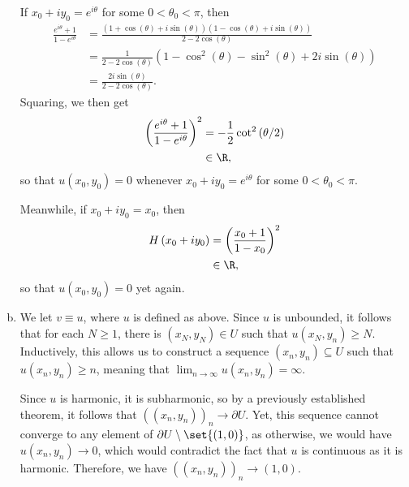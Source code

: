 \documentclass[10pt]{mypackage}
\begin{document}
\begin{solution}
\begin{enumerate}[(a)]
      If $x_0 + iy_0 = e^{i\theta}$ for some $0 < \theta_0 < \pi$, then
      \begin{align*}
        \frac{e^{i\theta} + 1}{1-e^{i\theta}} &= \frac{\left( 1 + \cos\left( \theta \right) + i\sin\left( \theta \right) \right)\left( 1 - \cos\left( \theta \right) + i\sin\left( \theta \right) \right)}{2-2\cos\left( \theta \right)}\\
                                              &= \frac{1}{2-2\cos\left( \theta \right)} \left( 1-\cos^2\left( \theta \right)-\sin^2\left( \theta \right) + 2i\sin\left( \theta \right) \right)\\
                                              &= \frac{2i\sin\left( \theta \right)}{2-2\cos\left( \theta \right)}.
      \end{align*}
      Squaring, we then get
      \begin{align*}
        \left( \frac{e^{i\theta} + 1}{1-e^{i\theta}} \right)^2 &= -\frac{1}{2}\cot^2\left( \theta/2 \right)\\
                                                               &\in \R,
      \end{align*}
      so that $u\left( x_0,y_0 \right) = 0$ whenever $x_0 + iy_0 = e^{i\theta}$ for some $0 < \theta_0 < \pi$.\newline

      Meanwhile, if $x_0 + iy_0 = x_0$, then
      \begin{align*}
        H\left( x_0 + iy_0 \right) &= \left( \frac{x_0 + 1}{1-x_0} \right)^2\\
                                   &\in \R,
      \end{align*}
      so that $u\left( x_0,y_0 \right) = 0$ yet again.
    \item We let $v \equiv u$, where $u$ is defined as above. Since $u$ is unbounded, it follows that for each $N\geq 1$, there is $\left( x_N,y_N \right)\in U$ such that $u\left( x_N,y_n \right) \geq N$. Inductively, this allows us to construct a sequence $\left( x_n,y_n \right)\subseteq U$ such that $u\left( x_n,y_n \right) \geq n$, meaning that $\lim_{n\rightarrow\infty}u\left( x_n,y_n \right) =\infty$.\newline

      Since $u$ is harmonic, it is subharmonic, so by a previously established theorem, it follows that $\left( \left( x_n,y_n \right) \right)_n\rightarrow \partial U$. Yet, this sequence cannot converge to any element of $\partial U\setminus \set{\left( 1,0 \right)}$, as otherwise, we would have $u\left( x_n,y_n \right)\rightarrow 0$, which would contradict the fact that $u$ is continuous as it is harmonic. Therefore, we have $\left( \left( x_n,y_n \right) \right)_{n}\rightarrow \left( 1,0 \right)$.
  \end{enumerate}
\end{solution}
\end{document}
